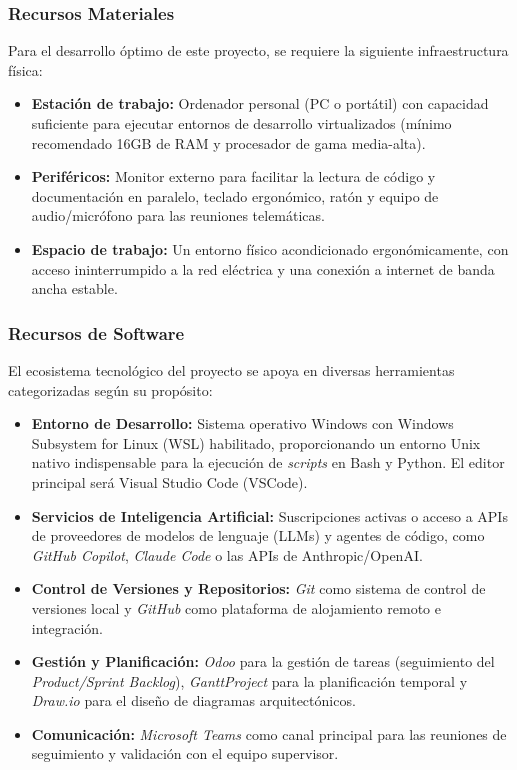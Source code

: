\documentclass[11pt, letterpaper]{article}
\begin{document}
\subsubsection{Recursos Materiales}
Para el desarrollo óptimo de este proyecto, se requiere la siguiente infraestructura física:
\begin{itemize}
    \item \textbf{Estación de trabajo:} Ordenador personal (PC o portátil) con capacidad suficiente para ejecutar entornos de desarrollo virtualizados (mínimo recomendado 16GB de RAM y procesador de gama media-alta).
    \item \textbf{Periféricos:} Monitor externo para facilitar la lectura de código y documentación en paralelo, teclado ergonómico, ratón y equipo de audio/micrófono para las reuniones telemáticas.
    \item \textbf{Espacio de trabajo:} Un entorno físico acondicionado ergonómicamente, con acceso ininterrumpido a la red eléctrica y una conexión a internet de banda ancha estable.
\end{itemize}

\subsubsection{Recursos de Software}
El ecosistema tecnológico del proyecto se apoya en diversas herramientas categorizadas según su propósito:
\begin{itemize}
    \item \textbf{Entorno de Desarrollo:} Sistema operativo Windows con Windows Subsystem for Linux (WSL) habilitado, proporcionando un entorno Unix nativo indispensable para la ejecución de \textit{scripts} en Bash y Python. El editor principal será Visual Studio Code (VSCode).
    \item \textbf{Servicios de Inteligencia Artificial:} Suscripciones activas o acceso a APIs de proveedores de modelos de lenguaje (LLMs) y agentes de código, como \textit{GitHub Copilot}, \textit{Claude Code} o las APIs de Anthropic/OpenAI.
    \item \textbf{Control de Versiones y Repositorios:} \textit{Git} como sistema de control de versiones local y \textit{GitHub} como plataforma de alojamiento remoto e integración.
    \item \textbf{Gestión y Planificación:} \textit{Odoo} para la gestión de tareas (seguimiento del \textit{Product/Sprint Backlog}), \textit{GanttProject} para la planificación temporal y \textit{Draw.io} para el diseño de diagramas arquitectónicos.
    \item \textbf{Comunicación:} \textit{Microsoft Teams} como canal principal para las reuniones de seguimiento y validación con el equipo supervisor.
\end{itemize}
\end{document}
